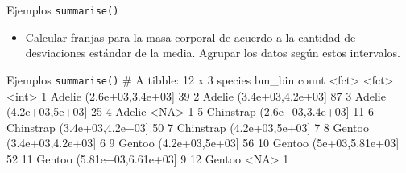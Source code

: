 \documentclass[
  ignorenonframetext,
  aspectratio=169]{beamer}
\newenvironment{Shaded}{\begin{snugshade}}{\end{snugshade}}
\newcommand{\AttributeTok}[1]{\textcolor[rgb]{0.77,0.63,0.00}{#1}}
\newcommand{\DecValTok}[1]{\textcolor[rgb]{0.00,0.00,0.81}{#1}}
\newcommand{\FunctionTok}[1]{\textcolor[rgb]{0.00,0.00,0.00}{#1}}
\newcommand{\NormalTok}[1]{#1}
\newcommand{\OtherTok}[1]{\textcolor[rgb]{0.56,0.35,0.01}{#1}}
\newcommand{\SpecialCharTok}[1]{\textcolor[rgb]{0.00,0.00,0.00}{#1}}
\newcommand{\StringTok}[1]{\textcolor[rgb]{0.31,0.60,0.02}{#1}}
\providecommand{\tightlist}{%
  \setlength{\itemsep}{0pt}\setlength{\parskip}{0pt}}
\let\oldverbatim\verbatim
\let\endoldverbatim\endverbatim
\renewenvironment{verbatim}{\tiny\oldverbatim}{\endoldverbatim}
\begin{document}
\begin{frame}[fragile]{Ejemplos \texttt{summarise()}}
\protect\hypertarget{ejemplos-summarise-5}{}
\begin{itemize}
\tightlist
\item
  Calcular franjas para la masa corporal de acuerdo a la cantidad de
  desviaciones estándar de la media. Agrupar los datos según estos
  intervalos.
\end{itemize}

\begin{Shaded}
\end{Shaded}
\end{frame}

\begin{frame}[fragile]{Ejemplos \texttt{summarise()}}
\protect\hypertarget{ejemplos-summarise-6}{}
\begin{verbatim}
# A tibble: 12 x 3
   species   bm_bin              count
   <fct>     <fct>               <int>
 1 Adelie    (2.6e+03,3.4e+03]      39
 2 Adelie    (3.4e+03,4.2e+03]      87
 3 Adelie    (4.2e+03,5e+03]        25
 4 Adelie    <NA>                    1
 5 Chinstrap (2.6e+03,3.4e+03]      11
 6 Chinstrap (3.4e+03,4.2e+03]      50
 7 Chinstrap (4.2e+03,5e+03]         7
 8 Gentoo    (3.4e+03,4.2e+03]       6
 9 Gentoo    (4.2e+03,5e+03]        56
10 Gentoo    (5e+03,5.81e+03]       52
11 Gentoo    (5.81e+03,6.61e+03]     9
12 Gentoo    <NA>                    1
\end{verbatim}
\end{frame}
\end{document}
